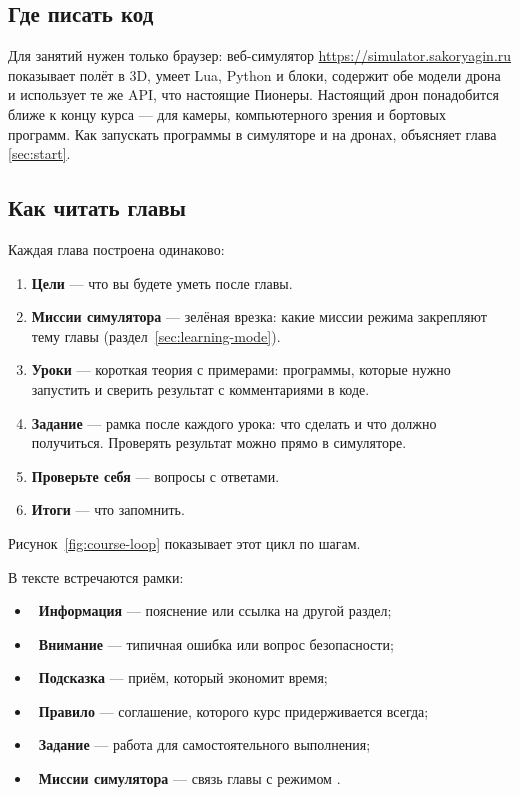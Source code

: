 \subsection*{Где писать код}

Для занятий нужен только браузер: веб-симулятор \url{https://simulator.sakoryagin.ru} показывает полёт в 3D, умеет Lua, Python и блоки, содержит обе модели дрона и использует те же API, что настоящие Пионеры. Настоящий дрон понадобится ближе к концу курса --- для камеры, компьютерного зрения и бортовых программ. Как запускать программы в симуляторе и на дронах, объясняет глава \ref{sec:start}.

\subsection*{Как читать главы}

Каждая глава построена одинаково:
\begin{enumerate}
    \item \textbf{Цели} --- что вы будете уметь после главы.
    \item \textbf{Миссии симулятора} --- зелёная врезка: какие миссии режима  закрепляют тему главы (раздел~\ref{sec:learning-mode}).
    \item \textbf{Уроки} --- короткая теория с примерами: программы, которые нужно запустить и сверить результат с комментариями в коде.
    \item \textbf{Задание} --- рамка после каждого урока: что сделать и что должно получиться. Проверять результат можно прямо в симуляторе.
    \item \textbf{Проверьте себя} --- вопросы с ответами.
    \item \textbf{Итоги} --- что запомнить.
\end{enumerate}

Рисунок~\ref{fig:course-loop} показывает этот цикл по шагам.



В тексте встречаются рамки:
\begin{itemize}
    \item \textcolor{GeoskanBlue}{\faInfoCircle}~\textbf{Информация} --- пояснение или ссылка на другой раздел;
    \item \textcolor{red!70!black}{\faExclamationTriangle}~\textbf{Внимание} --- типичная ошибка или вопрос безопасности;
    \item \textcolor{GeoskanOrange}{\faLightbulb}~\textbf{Подсказка} --- приём, который экономит время;
    \item \textcolor{GeoskanDarkBlue}{\faGavel}~\textbf{Правило} --- соглашение, которого курс придерживается всегда;
    \item \textcolor{GeoskanOrange}{\faPencilAlt}~\textbf{Задание} --- работа для самостоятельного выполнения;
    \item \textcolor{TaskTeal}{\faGamepad}~\textbf{Миссии симулятора} --- связь главы с режимом .
\end{itemize}

